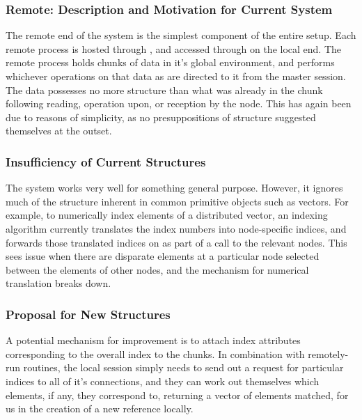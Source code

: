 \subsubsection{Remote: Description and Motivation for Current System}\label{description-and-motivation-for-current-system}

The remote end of the system is the simplest component of the entire
setup. Each remote \R{} process is hosted through
, and accessed through  on the local
end. The remote \R{} process holds chunks of data in it's global
environment, and performs whichever operations on that data as are
directed to it from the master \R{} session. The data possesses no more
structure than what was already in the chunk following reading,
operation upon, or reception by the node. This has again been due to
reasons of simplicity, as no presuppositions of structure suggested
themselves at the outset.

\subsubsection{Insufficiency of Current Structures}\label{insufficiency-of-current-structures-1}

The system works very well for something general purpose. However, it
ignores much of the structure inherent in common primitive \R{} objects
such as vectors. For example, to numerically index elements of a
distributed vector, an indexing algorithm currently translates the index
numbers into node-specific indices, and forwards those translated
indices on as part of a call to the relevant nodes. This sees issue when
there are disparate elements at a particular node selected between the
elements of other nodes, and the mechanism for numerical translation
breaks down.

\subsubsection{Proposal for New Structures}\label{proposal-for-new-structures}

A potential mechanism for improvement is to attach index attributes
corresponding to the overall index to the chunks. In combination with
remotely-run routines, the local session simply needs to send out a
request for particular indices to all of it's connections, and they can
work out themselves which elements, if any, they correspond to,
returning a vector of elements matched, for us in the creation of a new
reference locally.

